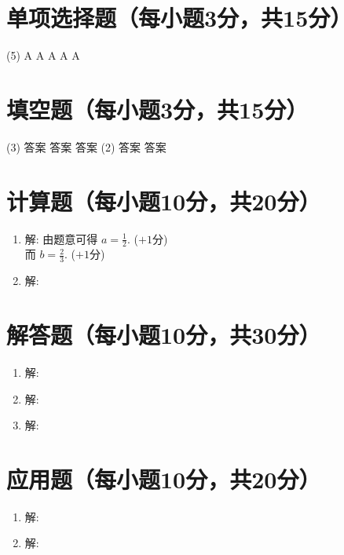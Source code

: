 \documentclass[AutoFakeBold=2.85]{cjluexam}
\begin{document}
\maketitle

\section{单项选择题（每小题3分，共15分）}

\begin{tasks}(5)
  \task A
  \task A
  \task A
  \task A
  \task A
\end{tasks}

\section{填空题（每小题3分，共15分）}

\begin{tasks}(3)
  \task 答案
  \task 答案
  \task 答案
  \task*(2) 答案
  \task 答案
\end{tasks}

\section{计算题（每小题10分，共20分）}

\begin{enumerate}
  \item 解:
    由题意可得 $\displaystyle a=\frac12$.
    \dotfill ($+1$分)\\
    而 $\displaystyle b=\frac23$.
    \dotfill ($+1$分)
  \item 解:
\end{enumerate}

\section{解答题（每小题10分，共30分）}

\begin{enumerate}
  \item 解:
  \item 解:
  \item 解:
\end{enumerate}

\section{应用题（每小题10分，共20分）}

\begin{enumerate}
  \item 解:
  \item 解:
\end{enumerate}
\end{document}
